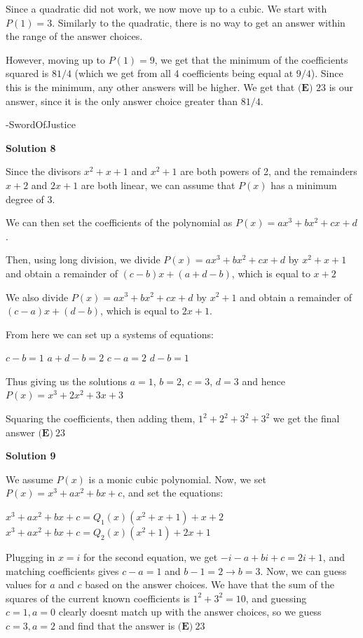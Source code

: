 \begin{enumerate}
 Since a quadratic did not work, we now move up to a cubic. We start with $P(1) = 3$. Similarly to the quadratic, there is no way to get an answer within the range of the answer choices. 

 However, moving up to $P(1) = 9$, we get that the minimum of the coefficients squared is $81/4$ (which we get from all 4 coefficients being equal at $9/4$). Since this is the minimum, any other answers will be higher. We get that $\boxed{\textbf{(E) }23}$ is our answer, since it is the only answer choice greater than $81/4$.

 -SwordOfJustice

 



\textbf{Solution 8}

Since the divisors $x^2 + x + 1$ and $x^2 + 1$ are both powers of 2, and the remainders $x + 2$ and $2x + 1$ are both linear, we can assume that $P(x)$ has a minimum degree of 3.

 We can then set the coefficients of the polynomial as $P(x) = ax^3 + bx^2 + cx + d$.

 Then, using long division, we divide  $P(x) = ax^3 + bx^2 + cx + d$ by $x^2 + x + 1$ and obtain a remainder of $(c - b)x + (a + d - b)$, which is equal to $x + 2$

 We also divide $P(x) = ax^3 + bx^2 + cx + d$ by $x^2 + 1$ and obtain a remainder of $(c - a)x + (d - b)$, which is equal to $2x + 1$.

 From here we can set up a systems of equations:

 $c -b = 1$
$a + d - b = 2$
$c - a = 2$
$d - b = 1$

 Thus giving us the solutions $a = 1$, $b = 2$, $c = 3$, $d = 3$ and hence $P(x) = x^3 + 2x^2 + 3x + 3$

 Squaring the coefficients, then adding them, $1^2 + 2^2 + 3^2 + 3^2$ we get the final answer $\boxed{\textbf{(E)} \ 23}$




\textbf{Solution 9}

We assume $P(x)$ is a monic cubic polynomial. Now, we set $P(x)=x^{3}+ax^{2}+bx+c$, and set the equations:

 $x^{3}+ax^{2}+bx+c=Q_{1}(x)(x^{2}+x+1)+x+2$
$x^{3}+ax^{2}+bx+c=Q_{2}(x)(x^{2}+1)+2x+1$

 Plugging in $x=i$ for the second equation, we get $-i-a+bi+c=2i+1$, and matching coefficients gives $c-a=1$ and $b-1=2 \rightarrow b=3$. Now, we can guess values for $a$ and $c$ based on the answer choices. We have that the sum of the squares of the current known coefficients is $1^{2}+3^{2}=10$, and guessing $c=1, a=0$ clearly doesnt match up with the answer choices, so we guess $c=3, a=2$ and find that the answer is $\boxed{\textbf{(E)} \ 23}$





\end{enumerate}
